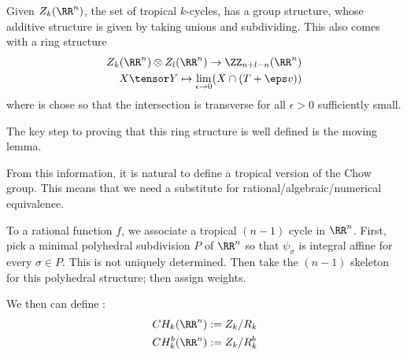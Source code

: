 


Given $Z_k(\RR^n)$, the set of tropical $k$-cycles, has a group structure, whose additive structure is given by taking unions and subdividing. This also comes with a ring structure 
\begin{align*}
    Z_k(\RR^n)\otimes Z_l(\RR^n)\to \ZZ_{n+l-n}(\RR^n)\\
    X\tensor Y \mapsto \lim_{\epsilon\to 0} (X\cap (T+\eps v))
\end{align*}
where is chose so that the intersection is transverse for all $\epsilon>0$ sufficiently small. 



The key step to proving that this ring structure is well defined is the moving lemma. 

From this information, it is natural to define a tropical version of the Chow group. This means that we need a substitute for rational/algebraic/numerical equivalence. 



To a rational function $f$, we associate a tropical $(n-1)$ cycle in $\RR^n$. First, pick a minimal polyhedral subdivision $P$  of $\RR^n$ so that $\psi_\sigma$ is integral affine for every $\sigma\in P$. This is not uniquely determined. Then take the $(n-1)$ skeleton for this polyhedral structure; then assign weights. 

We then can define :
\begin{align*} 
    CH_k(\RR^n):=Z_k/R_k \\
      CH_k^b(\RR^n):= Z_k/R^b_k
\end{align*}